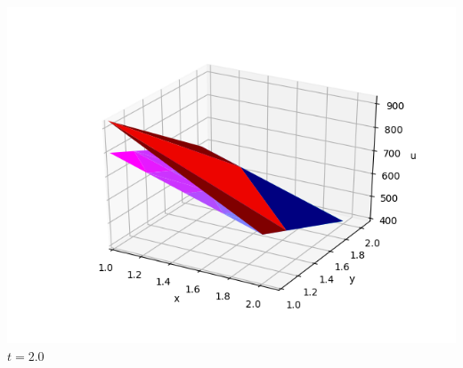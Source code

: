 \documentclass[]{beamer}
\begin{document}
\begin{frame}[t]
\begin{columns}
\begin{center}
			\includegraphics[scale=0.2]{figures/2D_rz_h1m/2D_rz_homog1mat_u_vs_x_20}\\
			$t=2.0$
			\end{center}
	\end{columns}
\end{frame}
\end{document}
